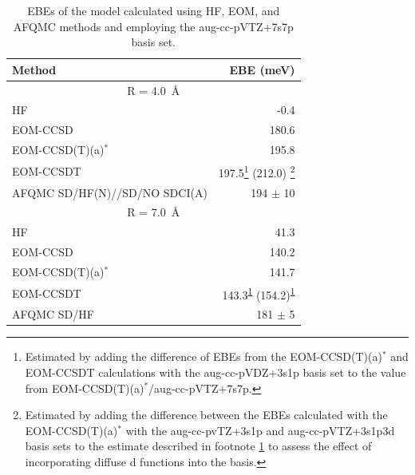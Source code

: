 \begin{table}
    \caption{\label{tab:EOM} EBEs of the  model calculated using HF, EOM, and AFQMC methods and employing the aug-cc-pVTZ+7s7p basis set.}
\begin{tabular}{lr}
Method & EBE (meV)                               \\
\hline
\multicolumn{2}{c}{R = \SI{4.0}{\angstrom}}     \\ 
HF            & -0.4        \\
EOM-CCSD      & 180.6          \\
EOM-CCSD(T)(a)$^*$ & 195.8          \\
EOM-CCSDT     & 197.5\footnote{\label{eomccsdt}Estimated by adding the difference of EBEs from the EOM-CCSD(T)(a)$^*$ and EOM-CCSDT calculations with the aug-cc-pVDZ+3s1p basis set to the value from EOM-CCSD(T)(a)$^*$/aug-cc-pVTZ+7s7p.} 
(212.0)
\footnote{\label{dfunc}Estimated by adding the difference between the EBEs calculated with the EOM-CCSD(T)(a)$^*$ with the aug-cc-pvTZ+3s1p and aug-cc-pVTZ+3s1p3d basis sets to the estimate described in footnote \ref{eomccsdt} to assess the effect of incorporating diffuse d functions into the basis.}  \\
AFQMC SD/HF(N)//SD/NO SDCI(A)     & 194 $\pm$ 10 \\ \hline
\multicolumn{2}{c}{R = \SI{7.0}{\angstrom}}                    \\ 
HF            & 41.3        \\
EOM-CCSD      & 140.2    \\
EOM-CCSD(T)(a)$^*$ & 141.7    \\
EOM-CCSDT    & 143.3\textsuperscript{\ref{eomccsdt}}  (154.2)\textsuperscript{\ref{dfunc}}     \\
AFQMC SD/HF     & 181 $\pm$ 5 \\ 
\end{tabular}
\end{table}

